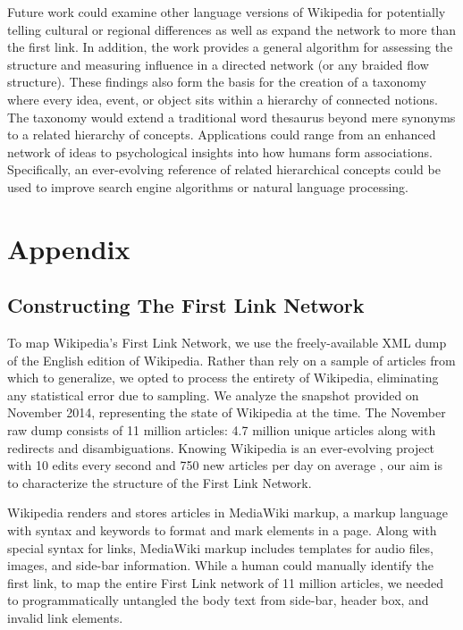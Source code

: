\documentclass[pre,twocolumn,twoside,superscriptaddress,floatfix]{revtex4-1}
\begin{document}
{Future work could examine other language versions of Wikipedia for potentially telling cultural or regional differences as well as expand the network to more than the first link.
In addition, the work provides a general algorithm for assessing the structure and measuring influence in a directed network (or any braided flow structure).
These findings also form the basis for the creation of a taxonomy where 
every idea, event, or object sits within a hierarchy of connected notions.
The taxonomy would extend a traditional word thesaurus beyond mere synonyms to a related hierarchy of concepts.
Applications could range from an enhanced network of ideas to psychological insights into how humans form associations.
Specifically, an ever-evolving reference of related hierarchical concepts could be 
used to improve search engine algorithms or natural language processing.

\newpage

\section{Appendix}
\label{Appendix}

\subsection{Constructing The First Link Network}

To map Wikipedia's First Link Network, we use the freely-available XML dump of the English edition of Wikipedia. 
Rather than rely on a sample of articles from which to generalize, we opted to process the entirety of Wikipedia, 
eliminating any statistical error due to sampling.
We analyze the snapshot provided on November 2014, representing the state of Wikipedia at the time.
The November raw dump consists of 11 million articles: 4.7 million unique articles along with redirects
and disambiguations.
Knowing Wikipedia is an ever-evolving project with 10 edits every second and 750 new articles per day on average
\cite{wiki_edits},
our aim is to characterize the structure of the First Link Network.

Wikipedia renders and stores articles in MediaWiki markup, a markup language with syntax and keywords to format and mark elements in a page. Along with special syntax for links, MediaWiki markup includes templates for audio files, images, and side-bar
information.
While a human could manually identify the first link, to map the entire First Link network of 11 million articles, we needed to programmatically untangled the body text from side-bar, header box, and invalid link elements.

}
\end{document}
